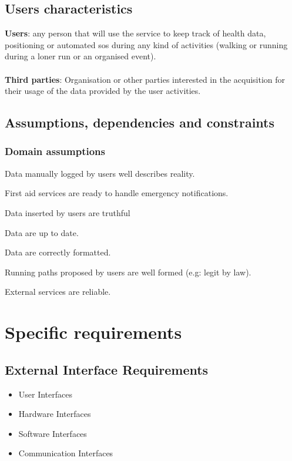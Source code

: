 \documentclass{article}
\begin{document}
\subsection{Users characteristics}
\textbf{Users}: any person that will use the service to keep track of health data, positioning or automated sos during any kind of activities (walking or running during a loner run or an organised event).\\\\
\textbf{Third parties}: Organisation or other parties interested in the acquisition for their usage of the data provided by the user activities.

\subsection{Assumptions, dependencies and constraints}

\subsubsection{Domain assumptions}

\begin{enumerate}[label={[D\arabic*]}]
    	\item Data manually logged by users well describes reality.
    	\item First aid services are ready to handle emergency notifications.
    	\item Data inserted by users are truthful 
    		\begin{enumerate}[label={[D\arabic{enumi}.\arabic*]}]
    			\item Data are up to date.
    			\item Data are correctly formatted.
  			\end{enumerate}
  		
  		\item Running paths proposed by users are well formed (e.g: legit by law).
  		\item External services are reliable.
\end{enumerate}

\section{Specific requirements}
\subsection{External Interface Requirements}
		\begin{itemize}
			\item User Interfaces
			\item Hardware Interfaces
			\item Software Interfaces
			\item Communication Interfaces
		\end{itemize}
\end{document}
